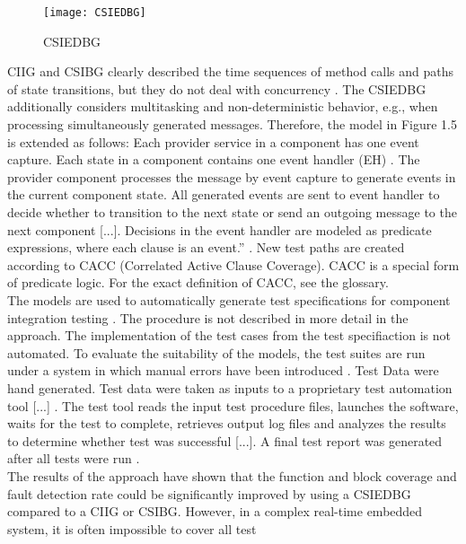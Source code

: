 \begin{figure}[H]
\begin{centering}
\texttt{[image: CSIEDBG]} 
\par\end{centering}
\caption{CSIEDBG \cite{Guan2015} }
\end{figure}
\textquotedbl CIIG and CSIBG clearly described the time sequences
of method calls and paths of state transitions, but they do not deal
with concurrency\textquotedbl{} \cite{Guan2015}. The CSIEDBG additionally
considers multitasking and non-deterministic behavior, e.g., when
processing simultaneously generated messages. Therefore, the model
in Figure 1.5 is extended as follows: Each provider service in a component
has one event capture. Each state in a component contains one event
handler (EH) \cite{Guan2015}. \textquotedbl The provider component
processes the message by event capture to generate events in the current
component state. All generated events are sent to event handler to
decide whether to transition to the next state or send an outgoing
message to the next component {[}...{]}. Decisions in the event handler
are modeled as predicate expressions, where each clause is an event.''
\cite{Guan2015}. New test paths are created according to CACC (Correlated
Active Clause Coverage). CACC is a special form of predicate logic.
For the exact definition of CACC, see the glossary.\\
The models are used to automatically generate test specifications
for component integration testing \cite{Guan2015}. The procedure
is not described in more detail in the approach. The implementation
of the test cases from the test specifiaction is not automated. To
evaluate the suitability of the models, the test suites are run under
a system in which manual errors have been introduced \cite{Guan2015}.
Test Data were hand generated. \textquotedbl Test data were taken
as inputs to a proprietary test automation tool {[}...{]} . The test
tool reads the input test procedure files, launches the software,
waits for the test to complete, retrieves output log files and analyzes
the results to determine whether test was successful {[}...{]}. A
final test report was generated after all tests were run\textquotedbl{}
\cite{Guan2015}.\\
The results of the approach have shown that the function and block
coverage and fault detection rate could be significantly improved
by using a CSIEDBG compared to a CIIG or CSIBG. However, in a complex
real-time embedded system, it is often impossible to cover all test
